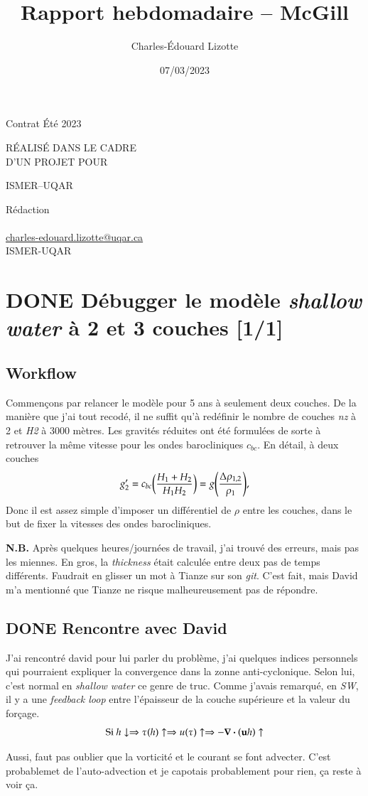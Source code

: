 \documentclass[10pt]{article}
\author{Charles-Édouard Lizotte}
\date{07/03/2023}
\title{Rapport hebdomadaire -- McGill}
\makeatletter
\numberwithin{equation}{section}
\newcommand{\mytitlepage}{
\begin{titlepage}
\begin{center}
{\Large Contrat Été 2023 \par}
\vspace{2cm}
{\Large \MakeUppercase{\thetitle} \par}
\vspace{2cm}
RÉALISÉ DANS LE CADRE\\ D'UN PROJET POUR \par
\vspace{2cm}
{\Large ISMER--UQAR \par}
\vspace{2cm}
{\thedate}
\end{center}
\vfill
Rédaction \\
{\theauthor}\\
\url{charles-edouard.lizotte@uqar.ca}\\
ISMER-UQAR
\end{titlepage}
}
\makeatother
\begin{document}
\mytitlepage
\tableofcontents\newpage


\section{{\bfseries\sffamily DONE} Débugger le modèle \emph{shallow water} à 2 et 3 couches [1/1]}
\label{sec:orga8a2689}
\subsection{Workflow}
\label{sec:orga720df6}
Commençons par relancer le modèle pour 5 ans à seulement deux couches.
De la manière que j'ai tout recodé, il ne suffit qu'à redéfinir le nombre de couches \emph{nz} à 2 et \emph{H2} à 3000 mètres.
Les gravités réduites ont été formulées de sorte à retrouver la même vitesse pour les ondes barocliniques \(c_{bc}\).
En détail, à deux couches
\begin{equation}
g_2' = c_{bc} \qty(\frac{H_1+H_2}{H_1H_2}) = g \qty(\frac{\Delta \rho_{1,2}}{\rho_1}),
\end{equation}
Donc il est assez simple d'imposer un différentiel de \(\rho\) entre les couches, dans le but de fixer la vitesses des ondes barocliniques.

\textbf{N.B.} Après quelques heures/journées de travail, j'ai trouvé des erreurs, mais pas les miennes.
En gros, la \emph{thickness} était calculée entre deux pas de temps différents.
Faudrait en glisser un mot à Tianze sur son \emph{git}.
C'est fait, mais David m'a mentionné que Tianze ne risque malheureusement pas de répondre.

\subsection{{\bfseries\sffamily DONE} Rencontre avec David}
\label{sec:org620c40c}
J'ai rencontré david pour lui parler du problème, j'ai quelques indices personnels qui pourraient expliquer la convergence dans la zonne anti-cyclonique. 
Selon lui, c'est normal en \emph{shallow water} ce genre de truc.
Comme j'avais remarqué, en \emph{SW}, il y a une \emph{feedback loop} entre l'épaisseur de la couche supérieure et la valeur du forçage.
\begin{equation}
\text{Si } h \downarrow
\Rightarrow \tau (h) \uparrow
\Rightarrow u(\tau) \uparrow
\Rightarrow -\divergence(\vb{u}h) \uparrow
\end{equation}

Aussi, faut pas oublier que la vorticité et le courant se font advecter.
C'est probablemet de l'auto-advection et je capotais probablement pour rien, ça reste à voir ça.\\[0pt]
\end{document}
